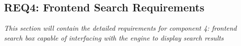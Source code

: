 \subsection{REQ4: Frontend Search Requirements}

\textit{This section will contain the detailed requirements for component 4: frontend search box capable of interfacing with the engine to display search results}

